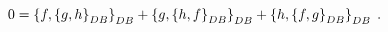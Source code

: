 \begin{equation}
0=\left\{  f,\left\{  g,h\right\}  _{{\footnotesize DB}}\right\}
_{{\footnotesize DB}}+\left\{  g,\left\{  h,f\right\}  _{{\footnotesize DB}%
}\right\}  _{{\footnotesize DB}}+\left\{  h,\left\{  f,g\right\}
_{{\footnotesize DB}}\right\}  _{{\footnotesize DB}}\;. \label{DBJI}%
\end{equation}


